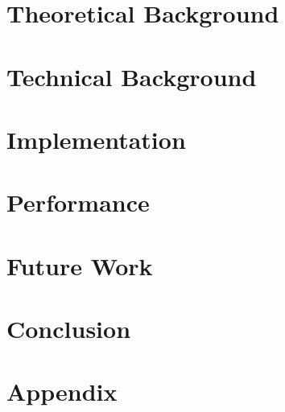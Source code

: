 \documentclass[headsepline,footsepline,footinclude=false,oneside,fontsize=11pt,paper=a4,listof=totoc,bibliography=totoc]{scrbook} %
\begin{document}


\frontmatter{}





\tableofcontents{}

\mainmatter{}




\chapter{Theoretical Background}


\chapter{Technical Background}



\chapter{Implementation}


\chapter{Performance}


\chapter{Future Work}


\chapter{Conclusion}



\appendix
\chapter{Appendix} \label{sec:appendix}

\appendix{}




\listoffigures{}
\listoftables{}
\printbibliography{}
\end{document}
